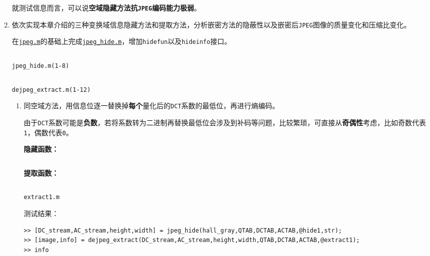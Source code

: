 \documentclass{article}
\numberwithin{figure}{section}
\numberwithin{table}{section}
\numberwithin{listing}{section}
\numberwithin{equation}{section}
\begin{document}
\begin{enumerate}
                就测试信息而言，可以说\textbf{空域隐藏方法抗\texttt{JPEG}编码能力极弱}。

            \item 依次实现本章介绍的三种变换域信息隐藏方法和提取方法，分析嵌密方法的隐蔽性以及嵌密后\texttt{JPEG}图像的质量变化和压缩比变化。

                在\href{../jpeg.m}{\texttt{jpeg.m}}的基础上完成\href{../jpeg_hide.m}{\texttt{jpeg\_hide.m}}，增加\texttt{hidefun}以及\texttt{hideinfo}接口。

                \begin{listing}[H]
                    \inputminted[firstline=1, lastline=8]{matlab}{../jpeg_hide.m}
                    \caption{\texttt{jpeg\_hide.m(1-8)}}
                \end{listing}

                \begin{listing}[H]
                    \inputminted[firstline=1, lastline=12]{matlab}{../dejpeg_extract.m}
                    \caption{\texttt{dejpeg\_extract.m(1-12)}}
                \end{listing}

                \begin{enumerate}
                    \item 同空域方法，用信息位逐一替换掉\textbf{每个}量化后的\texttt{DCT}系数的最低位，再进行熵编码。

                        由于\texttt{DCT}系数可能是\textbf{负数}，若将系数转为二进制再替换最低位会涉及到补码等问题，比较繁琐，可直接从\textbf{奇偶性}考虑，比如奇数代表\texttt{1}，偶数代表\texttt{0}。

                        \textbf{隐藏函数：}
                        \inputminted{matlab}{../hide1.m}
                        \begingroup
                        \endgroup

                        \textbf{提取函数：}
                        \begin{listing}[H]
                            \inputminted{matlab}{../extract1.m}
                            \caption{\texttt{extract1.m}}
                        \end{listing}

                        测试结果：

                        \begin{verbatim}
>> [DC_stream,AC_stream,height,width] = jpeg_hide(hall_gray,QTAB,DCTAB,ACTAB,@hide1,str);
>> [image,info] = dejpeg_extract(DC_stream,AC_stream,height,width,QTAB,DCTAB,ACTAB,@extract1);
>> info


\end{verbatim}
\end{enumerate}
\end{enumerate}
\end{document}
